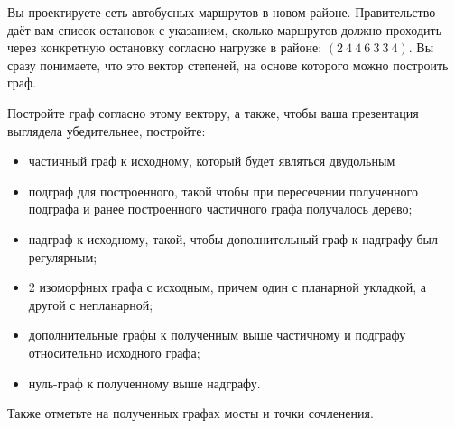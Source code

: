 \question
Вы проектируете сеть автобусных маршрутов в новом районе. Правительство даёт вам список остановок с указанием, сколько маршрутов должно проходить через конкретную остановку согласно нагрузке в районе: $(2\ 4\ 4\ 6\ 3\ 3\ 4)$. Вы сразу понимаете, что это вектор степеней, на основе которого можно построить граф.

Постройте граф согласно этому вектору, а также, чтобы ваша презентация выглядела убедительнее, постройте:

\begin{itemize}
\item частичный граф к исходному, который будет являться двудольным
\item подграф для построенного, такой чтобы при пересечении полученного подграфа и ранее построенного частичного графа получалось дерево;
\item надграф к исходному, такой, чтобы дополнительный граф к надграфу был регулярным;
\item 2 изоморфных графа с исходным, причем один с планарной укладкой, а другой с непланарной;
\item дополнительные графы к полученным выше частичному и подграфу относительно исходного графа;
\item нуль-граф к полученному выше надграфу.
\end{itemize}

Также отметьте на полученных графах мосты и точки сочленения.
